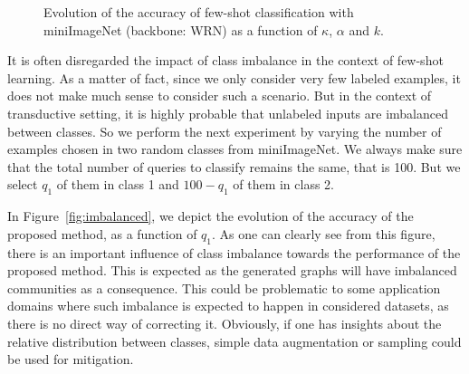 \documentclass[a4paper,conference]{IEEEtran}
\begin{document}
\begin{figure}[h]
\begin{center}
  \end{center}
  \vspace{-.5cm}
  \caption{Evolution of the accuracy of few-shot classification with miniImageNet (backbone: WRN) as a function of $\kappa$, $\alpha$ and $k$.}
  \label{fig:functionofkappa}
\end{figure}

It is often disregarded the impact of class imbalance in the context of few-shot learning. As a matter of fact, since we only consider very few labeled examples, it does not make much sense to consider such a scenario. But in the context of transductive setting, it is highly probable that unlabeled inputs are imbalanced between classes. So we perform the next experiment by varying the number of examples chosen in two random classes from miniImageNet. We always make sure that the total number of queries to classify remains the same, that is 100. But we select $q_1$ of them in class 1 and $100-q_1$ of them in class 2.

In Figure~\ref{fig:imbalanced}, we depict the evolution of the accuracy of the proposed method, as a function of $q_1$. As one can clearly see from this figure, there is an important influence of class imbalance towards the performance of the proposed method. This is expected as the generated graphs will have imbalanced communities as a consequence. This could be problematic to some application domains where such imbalance is expected to happen in considered datasets, as there is no direct way of correcting it. Obviously, if one has insights about the relative distribution between classes, simple data augmentation or sampling could be used for mitigation.
\end{document}
